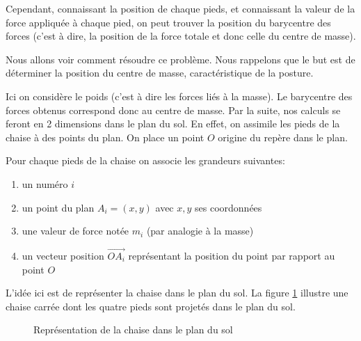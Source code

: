 \documentclass{polytech/polytech}
\begin{document}
Cependant, connaissant la position de chaque pieds, et connaissant la valeur de la force appliquée à chaque pied, on peut trouver la position du barycentre des forces (c'est à dire, la position de la force totale et donc celle du centre de masse). 

Nous allons voir comment résoudre ce problème. Nous rappelons que le but est de déterminer la position du centre de masse, caractéristique de la posture.

Ici on considère le poids (c'est à dire les forces liés à la masse). Le barycentre des forces obtenus correspond donc au centre de masse. 
Par la suite, nos calculs se feront en 2 dimensions dans le plan du sol. En effet, on assimile les pieds de la chaise à des points du plan. On place un point $O$ origine du repère dans le plan. 

Pour chaque pieds de la chaise on associe les grandeurs suivantes:

\begin{enumerate}
\item un numéro $i$
\item un point du plan $A_i=(x,y)$ avec $x,y$ ses coordonnées
\item une valeur de force notée $m_i$ (par analogie à la masse)
\item un vecteur position $\vec{OA_i}$ représentant la position du point par rapport au point $O$
\end{enumerate}

L'idée ici est de représenter la chaise dans le plan du sol. La figure \ref{fig:schem_plan_sol_math} illustre une chaise carrée dont les quatre pieds sont projetés dans le plan du sol.


\begin{figure}[htbp]
\begin{center}
\end{center}
\caption{Représentation de la chaise dans le plan du sol}
\label{fig:schem_plan_sol_math}
\end{figure}
\end{document}
